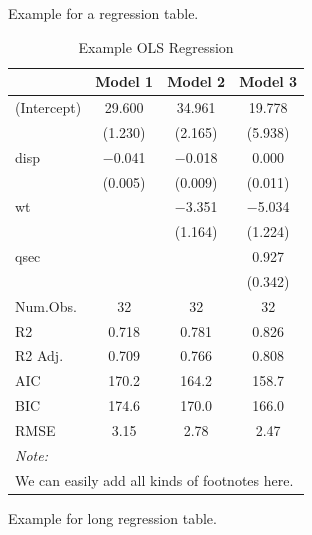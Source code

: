 \documentclass[
  12pt,
]{article}
\begin{document}
Example for a regression table.

\begin{table}

\caption{\label{tab:example-table}Example OLS Regression}
\centering
\begin{tabular}[t]{lccc}
\toprule
  & Model 1 & Model 2 & Model 3\\
\midrule
(Intercept) & \num{29.600} & \num{34.961} & \num{19.778}\\
 & (\num{1.230}) & (\num{2.165}) & (\num{5.938})\\
disp & \num{-0.041} & \num{-0.018} & \num{0.000}\\
 & (\num{0.005}) & (\num{0.009}) & (\num{0.011})\\
wt &  & \num{-3.351} & \num{-5.034}\\
 &  & (\num{1.164}) & (\num{1.224})\\
qsec &  &  & \num{0.927}\\
 &  &  & (\num{0.342})\\
\midrule
Num.Obs. & \num{32} & \num{32} & \num{32}\\
R2 & \num{0.718} & \num{0.781} & \num{0.826}\\
R2 Adj. & \num{0.709} & \num{0.766} & \num{0.808}\\
AIC & \num{170.2} & \num{164.2} & \num{158.7}\\
BIC & \num{174.6} & \num{170.0} & \num{166.0}\\
RMSE & \num{3.15} & \num{2.78} & \num{2.47}\\
\bottomrule
\multicolumn{4}{l}{\rule{0pt}{1em}\textit{Note: }}\\
\multicolumn{4}{l}{\rule{0pt}{1em}We can easily add all kinds of footnotes here.}\\
\end{tabular}
\end{table}

Example for long regression table.
\end{document}
